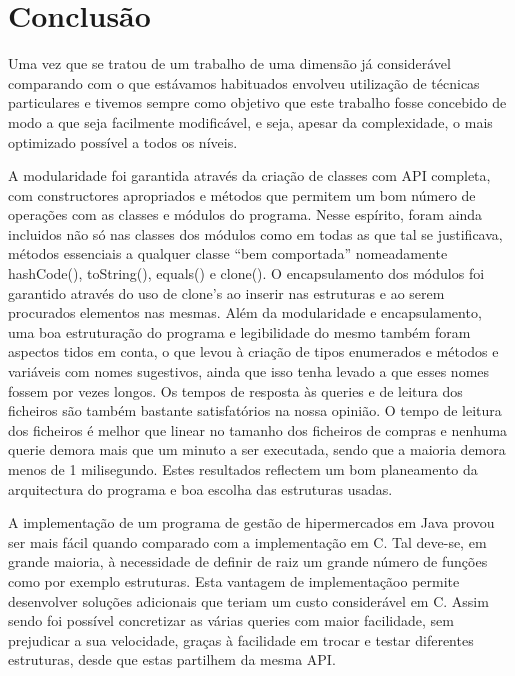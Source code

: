 \chapter{Conclusão}

Uma vez que se tratou de um trabalho de uma dimensão já considerável comparando com o que estávamos habituados envolveu utilização de técnicas particulares e tivemos sempre como objetivo que este trabalho fosse concebido de modo a que seja facilmente modificável, e seja, apesar da complexidade, o mais optimizado possível a todos os níveis.


A modularidade foi garantida através da criação de classes com API completa, com constructores apropriados e métodos que permitem um bom número de operações com as classes e módulos do programa. Nesse espírito, foram ainda incluidos não só nas classes dos módulos como em todas as que tal se justificava, métodos essenciais a qualquer classe “bem comportada” nomeadamente hashCode(), toString(), equals() e clone().
O encapsulamento dos módulos foi garantido através do uso de clone’s ao inserir nas estruturas e ao serem procurados elementos nas mesmas.
Além da modularidade e encapsulamento, uma boa estruturação do programa e legibilidade do mesmo também foram aspectos tidos em conta, o que levou à criação de tipos enumerados e métodos e variáveis com nomes sugestivos, ainda que isso tenha levado a que esses nomes fossem por vezes longos.
Os tempos de resposta às queries e de leitura dos ficheiros são também bastante satisfatórios na nossa opinião. O tempo de leitura dos ficheiros é melhor que linear no tamanho dos ficheiros de compras e nenhuma querie demora mais que um minuto a ser executada, sendo que a maioria demora menos de 1 milisegundo. Estes resultados reflectem um bom planeamento da arquitectura do programa e boa escolha das estruturas usadas.



A implementação de um programa de gestão de hipermercados em Java provou ser mais fácil
quando comparado com a implementação em C. Tal deve-se, em grande maioria, à necessidade de definir de raiz um grande número de funções como por exemplo estruturas. Esta vantagem de implementaçãoo permite desenvolver soluções adicionais que teriam um custo considerável em C.
Assim sendo foi possível concretizar as várias queries com maior facilidade, sem prejudicar a sua velocidade, graças à facilidade em trocar e testar diferentes estruturas, desde que estas partilhem da mesma API.